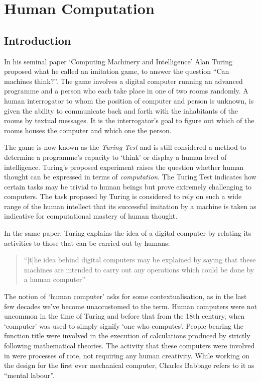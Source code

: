 \chapter{Human Computation}
\label{ch:human_computation}

\section{Introduction} %
\label{sec:hc_introduction}



In his seminal paper `Computing Machinery and Intelligence' Alan Turing proposed what he called an imitation game, to answer the question ``Can machines think?''\cite{Turing:1950wi}. The game involves a digital computer running an advanced programme and a person who each take place in one of two rooms randomly. A human interrogator to whom the position of computer and person is unknown, is given the ability to communicate back and forth with the inhabitants of the rooms by textual messages. It is the interrogator's goal to figure out which of the rooms houses the computer and which one the person.

The game is now known as the \emph{Turing Test} and is still considered a method to determine a programme's capacity to `think' or display a human level of intelligence. Turing's proposed experiment raises the question whether human thought can be expressed in terms of \emph{computation}. The Turing Test indicates how certain tasks may be trivial to human beings but prove extremely challenging to computers. The task proposed by Turing is considered to rely on such a wide range  of the human intellect that its successful imitation by a machine is taken as indicative for computational mastery of human thought.

In the same paper, Turing explains the idea of a digital computer by relating its activities to those that can be carried out by humans:

\begin{quote}
  ``[t]he idea behind digital computers may be explained by saying that these machines are intended to carry out any operations which could be done by a human computer''\cite{Turing:1950wi}
\end{quote}

The notion of `human computer' asks for some contextualisation, as in the last few decades we've become unaccustomed to the term. Human computers were not uncommon in the time of Turing and before that from the 18th century, when `computer' was used to simply signify `one who computes'\cite{grier2007computers}. People bearing the function title were involved in the execution of calculations produced by strictly following mathematical theories. The activity that these computers were involved in were processes of rote, not requiring any human creativity. While working on the design for the first ever mechanical computer, Charles Babbage refers to it as ``mental labour''\cite[Ch.\ 20]{Babbage:1832vu}.

